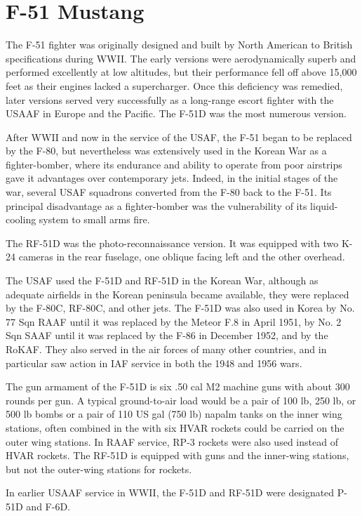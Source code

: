 \section*{F-51 Mustang}

The F-51 fighter was originally designed and built by North American to British specifications during WWII. The early versions were aerodynamically superb and performed excellently at low altitudes, but their performance fell off above 15,000 feet as their engines lacked a supercharger. Once this deficiency was remedied, later versions served very successfully as a long-range escort fighter with the USAAF in Europe and the Pacific. The F-51D was the most numerous version.

After WWII and now in the service of the USAF, the F-51 began to be replaced by the F-80, but nevertheless was extensively used in the Korean War as a fighter-bomber, where its endurance and ability to operate from poor airstrips gave it advantages over contemporary jets. Indeed, in the initial stages of the war, several USAF squadrons converted from the F-80 back to the F-51. Its principal disadvantage as a fighter-bomber was the vulnerability of its liquid-cooling system to small arms fire.

The RF-51D was the photo-reconnaissance version. It was equipped with two K-24 cameras in the rear fuselage, one oblique facing left and the other overhead. 

The USAF used the F-51D and RF-51D in the Korean War, although as adequate airfields in the Korean peninsula became available, they were replaced by the F-80C, RF-80C, and other jets. The F-51D was also used in Korea by No. 77 Sqn RAAF until it was replaced by the Meteor F.8 in April 1951, by No. 2 Sqn SAAF until it was replaced by the F-86 in December 1952, and by the RoKAF. They also served in the air forces of many other countries, and in particular saw action in IAF service in both the 1948 and 1956 wars. 

The gun armament of the F-51D is six .50 cal M2 machine guns with about 300 rounds per gun. A typical ground-to-air load would be a pair of 100 lb, 250 lb, or 500 lb bombs or a pair of 110 US gal (750 lb) napalm tanks on the inner wing stations, often combined in the with six HVAR rockets could be carried on the outer wing stations. In RAAF service, RP-3 rockets were also used instead of HVAR rockets. The RF-51D is equipped with guns and the inner-wing stations, but not the outer-wing stations for rockets.

In earlier USAAF service in WWII, the F-51D and RF-51D were designated P-51D and F-6D.


